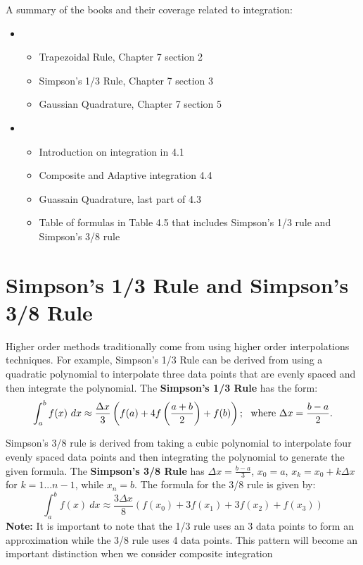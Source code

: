 \documentclass[twoside]{article}
\renewcommand{\cite}[1]{[#1]}
\def\ds{\displaystyle}
\begin{document}
A summary of the books and their coverage related to integration:
\begin{itemize}
    \item \cite{KK09}
    \begin{itemize}
        \item Trapezoidal Rule, Chapter 7 section 2
        \item Simpson's 1/3 Rule, Chapter 7 section 3
        \item Gaussian Quadrature, Chapter 7 section 5
    \end{itemize}
    \item \cite{LB16}
    \begin{itemize}
        \item Introduction on integration in 4.1
        \item Composite and Adaptive integration 4.4
        \item Guassain Quadrature, last part of 4.3
        \item Table of formulas in Table 4.5 that includes Simpson's 1/3 rule and Simpson's 3/8 rule
    \end{itemize}
\end{itemize}
\section{Simpson's 1/3 Rule and Simpson's 3/8 Rule}
Higher order methods traditionally come from using higher order interpolations techniques. For example, Simpson's 1/3 Rule can be derived from using a quadratic polynomial to interpolate three data points that are evenly spaced and then integrate the polynomial. The {\bf Simpson's 1/3 Rule} has the form:
$$\int_a^b f(x) \ dx \approx \frac {\Delta x}3 \left (f(a) + 4f\left ( \frac {a+b}2\right ) + f(b) \right ) ; \ \ {\rm where} \ \Delta x = \frac {b-a}2.$$

Simpson's 3/8 rule is derived from taking a cubic polynomial to interpolate four evenly spaced data points and then integrating the polynomial to generate the given formula. 
The {\bf Simpson's 3/8 Rule} has $\ds \Delta x=\frac {b-a}3$, $\ds x_0 =a$, $\ds x_k=x_0 + k\Delta x$ for $k=1 ...n-1$, while $\ds x_n=b$. The formula for the 3/8 rule is given by:
$$ \int_a^b f(x) \ dx \approx \frac {3 \Delta x}8 \left (f(x_0) + 3 f(x_1) + 3 f(x_2) + f(x_3)  \right ) $$
{\bf Note:} {\color{teal} It is important to note that the 1/3 rule uses an 3 data points to form an approximation while the 3/8 rule uses 4 data points. This pattern will become an important distinction when we consider composite integration}
\end{document}

